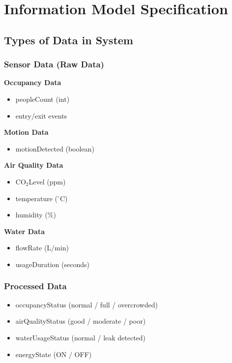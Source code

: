 \section{Information Model Specification}

\subsection{Types of Data in System}

\subsubsection{Sensor Data (Raw Data)}
\textbf{Occupancy Data}
\begin{itemize}
  \item peopleCount (int)
  \item entry/exit events
\end{itemize}

\textbf{Motion Data}
\begin{itemize}
  \item motionDetected (boolean)
\end{itemize}

\textbf{Air Quality Data}
\begin{itemize}
  \item CO$_2$Level (ppm)
  \item temperature ($^\circ$C)
  \item humidity (\%)
\end{itemize}

\textbf{Water Data}
\begin{itemize}
  \item flowRate (L/min)
  \item usageDuration (seconds)
\end{itemize}

\subsubsection{Processed Data}
\begin{itemize}
  \item occupancyStatus (normal / full / overcrowded)
  \item airQualityStatus (good / moderate / poor)
  \item waterUsageStatus (normal / leak detected)
  \item energyState (ON / OFF)
\end{itemize}

